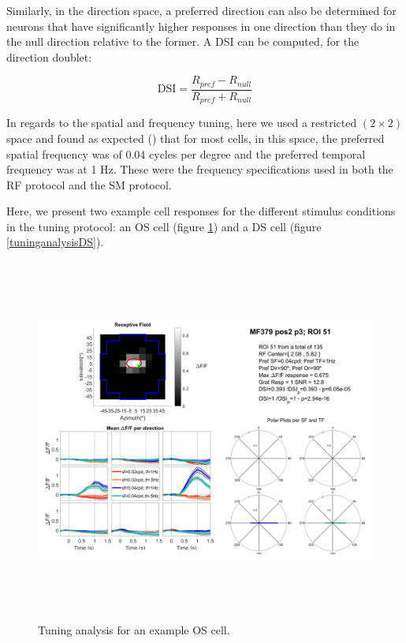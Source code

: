 Similarly, in the direction space, a preferred direction can also be determined for neurons that have significantly higher responses in one direction than they do in the null direction relative to the former. A DSI can be computed, for the direction doublet:

\begin{equation}
\text{DSI}=\dfrac{R_{pref} - R_{null}}{R_{pref} + R_{null}}
\end{equation}

In regards to the spatial and frequency tuning, here we used a restricted $(2 \times 2)$ space and found as expected (\cite{Whichpapershowsthis?}) that for most cells, in this space, the preferred spatial frequency was of 0.04 cycles per degree and the preferred temporal frequency was at 1 Hz. These were the frequency specifications used in both the RF protocol and the SM protocol.

Here, we present two example cell responses for the different stimulus conditions in the tuning protocol: an OS cell (figure \ref{tuninganalysisOS}) and a DS cell (figure \ref{tuninganalysisDS}).

\begin{figure}[H] \centering \includegraphics[width=12cm,height=12cm,keepaspectratio]{Figures/7.Results/tuning/MF379_pos2_p3_ROI0051.png} 
\caption{Tuning analysis for an example OS cell.}
\label{tuninganalysisOS}
\end{figure}

